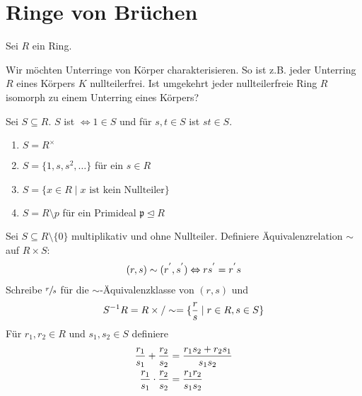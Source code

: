 \section{Ringe von Brüchen}

Sei $R$ ein Ring.

\begin{remark}
	Wir möchten Unterringe von Körper charakterisieren. So ist z.B. jeder Unterring $R$ eines Körpers $K$ nullteilerfrei. Ist umgekehrt jeder nullteilerfreie Ring $R$ isomorph zu einem Unterring eines Körpers?
\end{remark}

\begin{definition}[multiplikativ]
	Sei $S \subseteq R$. $S$ ist  $\Leftrightarrow 1 \in S$ und für $s,t \in S$ ist $st \in S$. 
\end{definition}

\begin{example}
	\begin{enumerate}
		\item $S = R^{\times}$
		\item $S = \{ 1, s, s^2, \dots \}$ für ein $s \in R$
		\item $S = \{ x \in R \mid x \text{ ist kein Nullteiler} \}$
		\item $S = R \setminus p$ für ein Primideal $\mathfrak{p} \unlhd R$
	\end{enumerate}
\end{example}

\begin{definition}
	Sei $S \subseteq R\setminus \{0\}$ multiplikativ und ohne Nullteiler. Definiere Äquivalenzrelation $\sim$ auf $R \times S$:
	\begin{align}
		(r,s) \sim (r^{'}, s^{'}) \Leftrightarrow r s^{'} = r^{'}s\notag 
	\end{align}
	Schreibe $\sfrac{r}{s}$ für die $\sim$-Äquivalenzklasse von $(r,s)$ und 
	\begin{align}
		S^{-1}R = R \times / \sim = \{ \frac{r}{s} \mid r \in R,s \in S\}\notag	
	\end{align}
	Für $r_1,r_2 \in R$ und $s_1, s_2 \in S$ definiere
	\begin{align}
		\frac{r_1}{s_1} + \frac{r_2}{s_2} &= \frac{r_1 s_2 + r_2 s_1}{s_1 s_2} \notag \\
		\frac{r_1}{s_1} \cdot \frac{r_2}{s_2} &= \frac{r_1 r_2}{s_1 s_2} \notag
	\end{align}
\end{definition}

